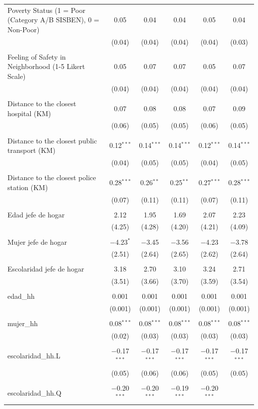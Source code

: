 \begin{table}[H]
\begin{tabularx}{0.9\textwidth}{@{\extracolsep{-7pt}}lccccc}
 Poverty Status (1 = Poor (Category A/B SISBEN), 0 = Non-Poor) & 0.05 & 0.04 & 0.04 & 0.05 & 0.04 \\    & (0.04) & (0.04) & (0.04) & (0.04) & (0.03) \\    & & & & & \\   Feeling of Safety in Neighborhood (1-5 Likert Scale) & 0.05 & 0.07 & 0.07 & 0.05 & 0.07 \\    & (0.04) & (0.04) & (0.04) & (0.04) & (0.04) \\    & & & & & \\   Distance to the closest hospital (KM) & 0.07 & 0.08 & 0.08 & 0.07 & 0.09 \\    & (0.06) & (0.05) & (0.05) & (0.06) & (0.05) \\    & & & & & \\   Distance to the closest public transport  (KM) & 0.12$^{***}$ & 0.14$^{***}$ & 0.14$^{***}$ & 0.12$^{***}$ & 0.14$^{***}$ \\    & (0.04) & (0.05) & (0.05) & (0.04) & (0.05) \\    & & & & & \\   Distance to the closest police station (KM) & 0.28$^{***}$ & 0.26$^{**}$ & 0.25$^{**}$ & 0.27$^{***}$ & 0.28$^{***}$ \\    & (0.07) & (0.11) & (0.11) & (0.07) & (0.11) \\    & & & & & \\   Edad jefe de hogar & 2.12 & 1.95 & 1.69 & 2.07 & 2.23 \\    & (4.25) & (4.28) & (4.20) & (4.21) & (4.09) \\    & & & & & \\   Mujer jefe de hogar & $-$4.23$^{*}$ & $-$3.45 & $-$3.56 & $-$4.23 & $-$3.78 \\    & (2.51) & (2.64) & (2.65) & (2.62) & (2.64) \\    & & & & & \\   Escolaridad jefe de hogar & 3.18 & 2.70 & 3.10 & 3.24 & 2.71 \\    & (3.51) & (3.66) & (3.70) & (3.59) & (3.54) \\    & & & & & \\   edad\_hh & 0.001 & 0.001 & 0.001 & 0.001 & 0.001 \\    & (0.001) & (0.001) & (0.001) & (0.001) & (0.001) \\    & & & & & \\   mujer\_hh & 0.08$^{***}$ & 0.08$^{***}$ & 0.08$^{***}$ & 0.08$^{***}$ & 0.08$^{***}$ \\    & (0.02) & (0.03) & (0.03) & (0.03) & (0.03) \\    & & & & & \\   escolaridad\_hh.L & $-$0.17$^{***}$ & $-$0.17$^{***}$ & $-$0.17$^{***}$ & $-$0.17$^{***}$ & $-$0.17$^{***}$ \\    & (0.05) & (0.06) & (0.06) & (0.05) & (0.05) \\    & & & & & \\   escolaridad\_hh.Q & $-$0.20$^{***}$ & $-$0.20$^{***}$ & $-$0.19$^{***}$ & $-$0.20$^{***}$ & 
\end{tabularx}
\end{table}
